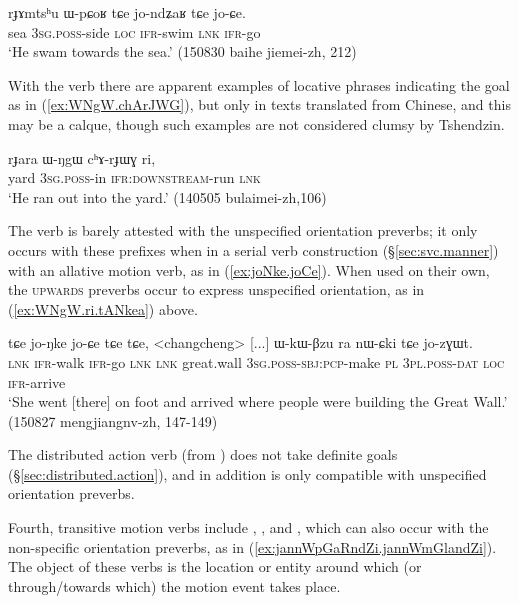 \begin{exe}
\ex \label{ex:jondZaR.tCe.joCe}
\gll rɟɤmtsʰu ɯ-pɕoʁ tɕe jo-ndʑaʁ tɕe jo-ɕe. \\
sea \textsc{3sg}.\textsc{poss}-side \textsc{loc} \textsc{ifr}-swim \textsc{lnk} \textsc{ifr}-go \\
\glt `He swam towards the sea.' (150830 baihe jiemei-zh, 212)
\end{exe}

With the verb  there are apparent examples of locative phrases indicating the goal as in (\ref{ex:WNgW.chArJWG}), but only in texts translated from Chinese, and this may be a calque, though such examples are not considered clumsy by Tshendzin.

\begin{exe}
\ex \label{ex:WNgW.chArJWG}
\gll  rɟara ɯ-ŋgɯ cʰɤ-rɟɯɣ ri, \\
yard \textsc{3sg}.\textsc{poss}-in \textsc{ifr}:\textsc{downstream}-run \textsc{lnk} \\
\glt `He ran out into the yard.' (140505 bulaimei-zh,106)
\end{exe}

The verb  is barely attested with the unspecified orientation preverbs; it only occurs with these prefixes when in a serial verb construction (§\ref{sec:svc.manner}) with an allative motion verb, as in (\ref{ex:joNke.joCe}). When used on their own, the \textsc{upwards} preverbs occur to express unspecified orientation, as in (\ref{ex:WNgW.ri.tANkea}) above.

\begin{exe}
\ex \label{ex:joNke.joCe}
\gll tɕe jo-ŋke jo-ɕe tɕe tɕe, <changcheng> [...] ɯ-kɯ-βzu ra nɯ-ɕki tɕe jo-zɣɯt. \\
\textsc{lnk} \textsc{ifr}-walk \textsc{ifr}-go \textsc{lnk} \textsc{lnk} great.wall {  } \textsc{3sg}.\textsc{poss}-\textsc{sbj}:\textsc{pcp}-make \textsc{pl} \textsc{3pl}.\textsc{poss}-\textsc{dat} \textsc{loc} \textsc{ifr}-arrive \\
\glt `She went [there] on foot and arrived where people were building the Great Wall.' (150827 mengjiangnv-zh, 147-149)
\end{exe}

The distributed action verb  (from ) does not take definite goals (§\ref{sec:distributed.action}), and in addition is only compatible with unspecified orientation preverbs.

Fourth, transitive motion verbs include , ,  and , which can also occur with the non-specific orientation preverbs, as in (\ref{ex:jannWpGaRndZi.jannWmGlandZi}). The object of these verbs is the location or entity around which (or through/towards which) the motion event takes place.
 
